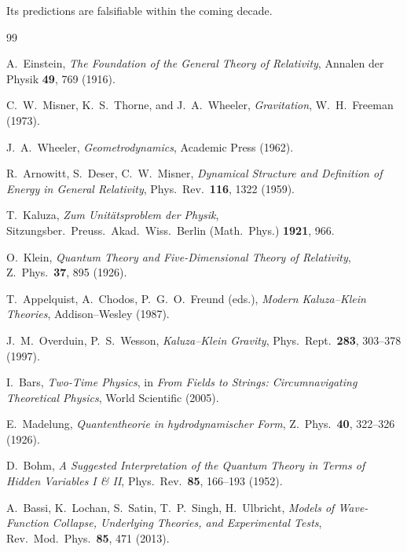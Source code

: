\documentclass[12pt]{article}
\begin{document}
Its predictions are falsifiable within the coming decade.

\newpage


\begin{thebibliography}{99}

A.~Einstein,
\textit{The Foundation of the General Theory of Relativity},
Annalen der Physik \textbf{49}, 769 (1916).

C.~W.~Misner, K.~S.~Thorne, and J.~A.~Wheeler,
\textit{Gravitation},
W.~H.~Freeman (1973).

J.~A.~Wheeler,
\textit{Geometrodynamics},
Academic Press (1962).

R.~Arnowitt, S.~Deser, C.~W.~Misner,
\textit{Dynamical Structure and Definition of Energy in General Relativity},
Phys.\ Rev.\ \textbf{116}, 1322 (1959).

T.~Kaluza,
\textit{Zum Unit\"atsproblem der Physik},
Sitzungsber.\ Preuss.\ Akad.\ Wiss.\ Berlin (Math.\ Phys.) \textbf{1921}, 966.

O.~Klein,
\textit{Quantum Theory and Five-Dimensional Theory of Relativity},
Z.\ Phys.\ \textbf{37}, 895 (1926).

T.~Appelquist, A.~Chodos, P.~G.~O.~Freund (eds.),
\textit{Modern Kaluza--Klein Theories},
Addison--Wesley (1987).

J.~M.~Overduin, P.~S.~Wesson,
\textit{Kaluza--Klein Gravity},
Phys.\ Rept.\ \textbf{283}, 303--378 (1997).

I.~Bars,
\textit{Two-Time Physics},
in \textit{From Fields to Strings: Circumnavigating Theoretical Physics},
World Scientific (2005).

E.~Madelung,
\textit{Quantentheorie in hydrodynamischer Form},
Z.\ Phys.\ \textbf{40}, 322–326 (1926).

D.~Bohm,
\textit{A Suggested Interpretation of the Quantum Theory in Terms of Hidden Variables I \& II},
Phys.\ Rev.\ \textbf{85}, 166–193 (1952).

A.~Bassi, K.~Lochan, S.~Satin, T.~P.~Singh, H.~Ulbricht,
\textit{Models of Wave-Function Collapse, Underlying Theories, and Experimental Tests},
Rev.\ Mod.\ Phys.\ \textbf{85}, 471 (2013).


\end{thebibliography}
\end{document}
